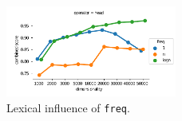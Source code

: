 \begin{figure}[h]
  \centering

  \includegraphics[width=0.5\textwidth]{supplement/figures/lexical-interaction-freq}

  \caption{Lexical influence of \texttt{freq}.}
  \label{fig:lexical-freq}
\end{figure}
